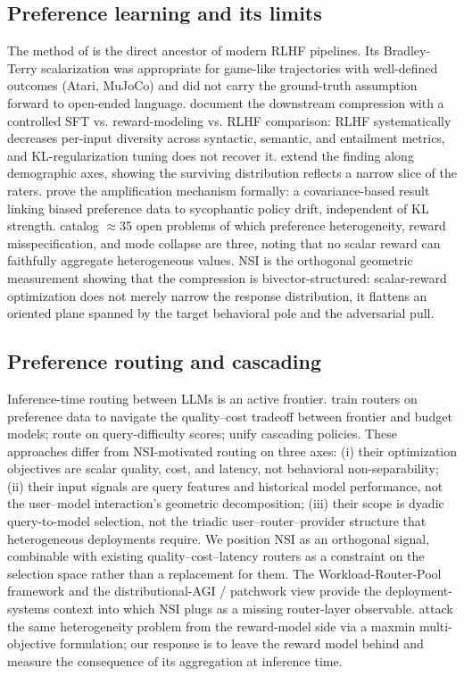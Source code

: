 \documentclass{article}
\begin{document}
\subsection{Preference learning and its limits}
\label{sec:related:rlhf}
The method of \citet{christiano2017deep} is the direct ancestor of modern RLHF pipelines. Its Bradley-Terry scalarization was appropriate for game-like trajectories with well-defined outcomes (Atari, MuJoCo) and did not carry the ground-truth assumption forward to open-ended language. \citet{kirk2024understanding} document the downstream compression with a controlled SFT vs. reward-modeling vs. RLHF comparison: RLHF systematically decreases per-input diversity across syntactic, semantic, and entailment metrics, and KL-regularization tuning does not recover it. \citet{santurkar2023whose} extend the finding along demographic axes, showing the surviving distribution reflects a narrow slice of the raters. \citet{shapira2026rlhf} prove the amplification mechanism formally: a covariance-based result linking biased preference data to sycophantic policy drift, independent of KL strength. \citet{casper2023open} catalog $\approx$35 open problems of which preference heterogeneity, reward misspecification, and mode collapse are three, noting that no scalar reward can faithfully aggregate heterogeneous values. NSI is the orthogonal geometric measurement showing that the compression is bivector-structured: scalar-reward optimization does not merely narrow the response distribution, it flattens an oriented plane spanned by the target behavioral pole and the adversarial pull.

\subsection{Preference routing and cascading}
Inference-time routing between LLMs is an active frontier. \citet{ong2024routellm} train routers on preference data to navigate the quality--cost tradeoff between frontier and budget models; \citet{ding2024hybrid} route on query-difficulty scores; \citet{dekoninck2024cascade} unify cascading policies. These approaches differ from NSI-motivated routing on three axes: (i) their optimization objectives are scalar quality, cost, and latency, not behavioral non-separability; (ii) their input signals are query features and historical model performance, not the user--model interaction's geometric decomposition; (iii) their scope is dyadic query-to-model selection, not the triadic user--router--provider structure that heterogeneous deployments require. We position NSI as an orthogonal signal, combinable with existing quality--cost--latency routers as a constraint on the selection space rather than a replacement for them. The Workload-Router-Pool framework \citep{wrp2026} and the distributional-AGI / patchwork view \citep{patchworkagi2025} provide the deployment-systems context into which NSI plugs as a missing router-layer observable. \citet{chakraborty2024maxmin} attack the same heterogeneity problem from the reward-model side via a maxmin multi-objective formulation; our response is to leave the reward model behind and measure the consequence of its aggregation at inference time.
\end{document}
